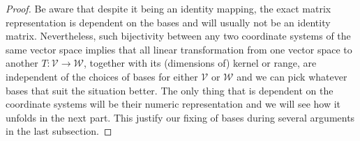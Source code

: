 \begin{proof}
Be aware that despite it being an identity mapping, the exact matrix representation is dependent on the bases and will usually not be an identity matrix. Nevertheless, such bijectivity between any two coordinate systems of the same vector space implies that all linear transformation from one vector space to another $T: \mathcal{V} \to \mathcal{W}$, together with its (dimensions of) kernel or range, are independent of the choices of bases for either $\mathcal{V}$ or $\mathcal{W}$ and we can pick whatever bases that suit the situation better. The only thing that is dependent on the coordinate systems will be their numeric representation and we will see how it unfolds in the next part. This justify our fixing of bases during several arguments in the last subsection.
\end{proof}

